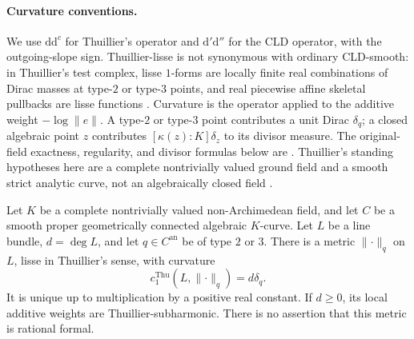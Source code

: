 \paragraph{Curvature conventions.}
We use \(\mathrm d\mathrm d^c\) for Thuillier's operator and
\(\mathrm d'\mathrm d''\) for the CLD operator, with the outgoing-slope
sign.  Thuillier-lisse is not synonymous with ordinary CLD-smooth:
in Thuillier's test complex, lisse \(1\)-forms are locally finite
real combinations of Dirac masses at type-\(2\) or type-\(3\) points,
and real piecewise affine skeletal pullbacks are lisse functions
\cite[Definition~3.2.1 and Proposition~3.2.4]{Thu05}.
Curvature is the operator applied to the additive weight
\(-\log\lVert e\rVert\).  A type-\(2\) or type-\(3\) point contributes
a unit Dirac \(\delta_q\); a closed algebraic point \(z\) contributes
\([\kappa(z):K]\delta_z\) to its divisor measure.
The original-field exactness, regularity, and divisor formulas below
are \cite[Proposition~3.3.11, Theorem~3.3.13(ii), and
Proposition~3.3.15]{Thu05}.  Thuillier's standing hypotheses here are a
complete nontrivially valued ground field and a smooth strict analytic
curve, not an algebraically closed field
\cite[opening of Chapter~2, p.~15, and Chapter~3, p.~61]{Thu05}.

\begin{proposition}
\label{prop:ch29-curve-point-reference}
Let \(K\) be a complete nontrivially valued non-Archimedean field, and
let \(C\) be a smooth proper geometrically connected algebraic
\(K\)-curve.  Let \(L\) be a line bundle, \(d=\deg L\), and let
\(q\in C^{\mathrm{an}}\) be of type \(2\) or \(3\).
There is a metric \(\lVert\cdot\rVert_q\) on \(L\), lisse in
Thuillier's sense, with curvature
\begin{equation}
\label{eq:ch29-curve-point-reference-curvature}
            c_1^{\mathrm{Thu}}(L,\lVert\cdot\rVert_q)=d\delta_q.
\end{equation}
It is unique up to multiplication by a positive real constant.  If
\(d\geq0\), its local additive weights are Thuillier-subharmonic.
There is no assertion that this metric is rational formal.
\end{proposition}


